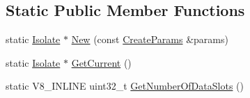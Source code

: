 \subsection*{Static Public Member Functions}
\begin{DoxyCompactItemize}
\item 
static \hyperlink{classv8_1_1_isolate}{Isolate} $\ast$ \hyperlink{classv8_1_1_isolate_ab6accf94a5a897fcc1220ab2c049e502}{New} (const \hyperlink{structv8_1_1_isolate_1_1_create_params}{Create\+Params} \&params)
\item 
static \hyperlink{classv8_1_1_isolate}{Isolate} $\ast$ \hyperlink{classv8_1_1_isolate_aa79441b5da4438221d0f38790c4de2ed}{Get\+Current} ()
\item 
static V8\+\_\+\+I\+N\+L\+I\+NE uint32\+\_\+t \hyperlink{classv8_1_1_isolate_a7060092fd45588f4085753b3da1b2c82}{Get\+Number\+Of\+Data\+Slots} ()
\end{DoxyCompactItemize}
